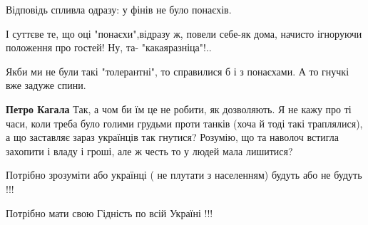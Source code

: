 \begin{itemize}
Відповідь спливла одразу: у фінів не було понаєхів.

\begin{itemize}
 
І суттєве те, що оці "понаєхи",відразу ж, повели себе-як дома, начисто ігноруючи положення про гостей! Ну, та- "какаяразніца"!..

 
Якби ми не були такі "толерантні", то справилися б і з понаєхами. А то гнучкі вже задуже спини.

 
\textbf{Петро Кагала} Так, а чом би їм це не робити, як дозволяють. Я не кажу
про ті часи, коли треба було голими грудьми проти танків (хоча й тоді такі
траплялися), а що заставляє зараз українців так гнутися? Розумію, що та наволоч
встигла захопити і владу і гроші, але ж честь то у людей мала лишитися?
\end{itemize}

 

Потрібно зрозуміти або українці ( не плутати з населенням) будуть або не будуть !!!

Потрібно мати свою Гідність по всій Україні !!!

\begin{itemize}
 

\end{itemize}
\end{itemize}
